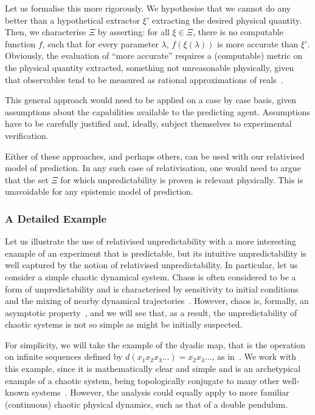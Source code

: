 \documentclass[information,article,accept,moreauthors,pdftex,12pt,a4paper]{mdpi}
\theoremstyle{mdpi}
\newcounter{ex}
\newcounter{re}
\theoremstyle{mdpidefinition}
\begin{document}
Let us formalise this more rigorously.
We hypothesise that we cannot do any better than a hypothetical extractor $\xi'$ extracting the desired physical quantity.
Then, we characterise $\Xi$ by asserting: for all $\xi\in\Xi$, there is no computable function $f$, such that for every parameter $\lambda$, $f(\xi(\lambda))$ is more accurate than $\xi'$.
Obviously, the evaluation of ``more accurate'' requires a (computable) metric on the physical quantity extracted, something not unreasonable physically, given that observables tend to be measured as rational approximations of reals~\cite{Longo:2008ud}.

This general approach would need to be applied on a case by case basis, given assumptions about the capabilities available to the predicting agent.
Assumptions have to be carefully justified and, ideally, subject themselves to experimental verification.

Either of these approaches, and perhaps others, can be used with our relativised model of prediction.
In any such case of relativisation, one would need to argue that the set $\Xi$ for which unpredictability is proven is relevant physically.
This is unavoidable for any epistemic model of prediction.

\subsubsection{A Detailed Example}

Let us illustrate the use of relativised unpredictability with a more interesting example of an experiment that is predictable, but its intuitive unpredictability is well captured by the notion of relativised unpredictability.
In particular, let us consider a simple chaotic dynamical system.
Chaos is often considered to be a form of unpredictability and is characterised by sensitivity to initial conditions and the mixing of nearby dynamical trajectories~\cite{Werndl:2009nx}.
However, chaos is, formally, an asymptotic property~\cite{Paul:2009fv}, and we will see that, as a result, the unpredictability of chaotic systems is not so simple as might be initially suspected.

For simplicity, we will take the example of the dyadic map, that is the operation on infinite sequences defined by $d(x_1x_2x_3\dots) = x_2x_3\dots$, as in~\cite{DBLP:conf/birthday/AbbottCS15}.
We work with this example, since it is mathematically clear and simple and is an archetypical example of a chaotic system, being topologically conjugate to many other well-known systems~\cite{Devaney-1989}.
However, the analysis could equally apply to more familiar (continuous) chaotic physical dynamics, such as that of a double pendulum.
\end{document}
